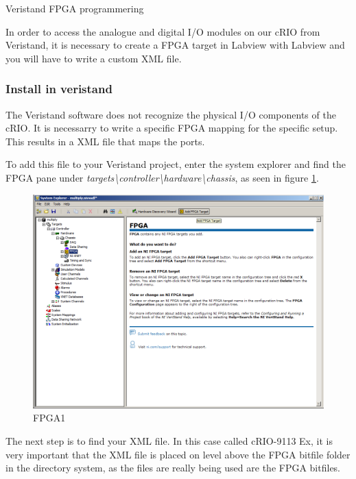 \documentclass[a4paper,twoside,english]{report}
\begin{document}
Veristand FPGA programmering

In order to access the analogue and digital I/O modules on our cRIO
from Veristand, it is necessary to create a FPGA target in Labview
with Labview and you will have to write a custom XML file.

\subsubsection{Install in veristand}

The Veristand software does not recognize the physical I/O components
of the cRIO. It is necessarry to write a specific FPGA mapping for
the specific setup. This results in a XML file that maps the ports. 

To add this file to your Veristand project, enter the system explorer
and find the FPGA pane under \textit{targets\textbackslash{}controller\textbackslash{}hardware\textbackslash{}chassis},
as seen in figure \ref{fig: fpga1}. 

\begin{figure}[!h]
\centering \includegraphics[scale=0.45]{fig/fpga1}

\caption{FPGA1}

\label{fig: fpga1}
\end{figure}

The next step is to find your XML file. In this case called cRIO-9113
Ex, it is very important that the XML file is placed on level above
the FPGA bitfile folder in the directory system, as the files are
really being used are the FPGA bitfiles.
\end{document}

